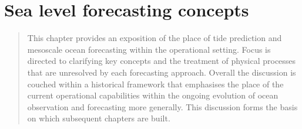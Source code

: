 \chapter{Sea level forecasting concepts}
\begin{quote}
{\small
This chapter provides an exposition of the place of tide prediction and mesoscale ocean forecasting within the operational setting.
Focus is directed to clarifying key concepts and the treatment of physical processes that are unresolved by each forecasting approach.   
Overall the discussion is couched within a historical framework that emphasises the place of the current operational capabilities within the ongoing evolution of ocean observation and forecasting more generally.
This discussion forms the basis on which subsequent chapters are built.
}
\end{quote}


\label{chp:forecastConcepts}



